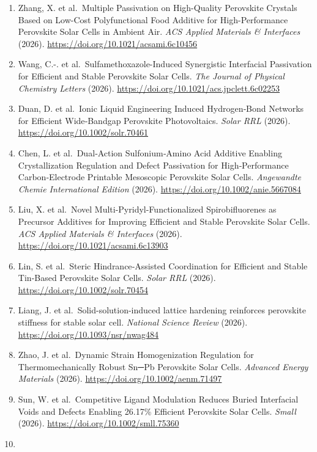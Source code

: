 \documentclass[
  11pt,
]{article}
\begin{document}
\begin{enumerate}
  \emph{Advanced Functional Materials} (2026).
  \url{https://doi.org/10.1002/adfm.78067}
\item
  Zhang, X. et al.~Multiple Passivation on High-Quality Perovskite
  Crystals Based on Low-Cost Polyfunctional Food Additive for
  High-Performance Perovskite Solar Cells in Ambient Air. \emph{ACS
  Applied Materials \& Interfaces} (2026).
  \url{https://doi.org/10.1021/acsami.6c10456}
\item
  Wang, C.-. et al.~Sulfamethoxazole-Induced Synergistic Interfacial
  Passivation for Efficient and Stable Perovskite Solar Cells. \emph{The
  Journal of Physical Chemistry Letters} (2026).
  \url{https://doi.org/10.1021/acs.jpclett.6c02253}
\item
  Duan, D. et al.~Ionic Liquid Engineering Induced Hydrogen‐Bond
  Networks for Efficient Wide‐Bandgap Perovskite Photovoltaics.
  \emph{Solar RRL} (2026). \url{https://doi.org/10.1002/solr.70461}
\item
  Chen, L. et al.~Dual‐Action Sulfonium‐Amino Acid Additive Enabling
  Crystallization Regulation and Defect Passivation for High‐Performance
  Carbon‐Electrode Printable Mesoscopic Perovskite Solar Cells.
  \emph{Angewandte Chemie International Edition} (2026).
  \url{https://doi.org/10.1002/anie.5667084}
\item
  Liu, X. et al.~Novel Multi-Pyridyl-Functionalized Spirobifluorenes as
  Precursor Additives for Improving Efficient and Stable Perovskite
  Solar Cells. \emph{ACS Applied Materials \& Interfaces} (2026).
  \url{https://doi.org/10.1021/acsami.6c13903}
\item
  Lin, S. et al.~Steric Hindrance‐Assisted Coordination for Efficient
  and Stable Tin‐Based Perovskite Solar Cells. \emph{Solar RRL} (2026).
  \url{https://doi.org/10.1002/solr.70454}
\item
  Liang, J. et al.~Solid-solution-induced lattice hardening reinforces
  perovskite stiffness for stable solar cell. \emph{National Science
  Review} (2026). \url{https://doi.org/10.1093/nsr/nwag484}
\item
  Zhao, J. et al.~Dynamic Strain Homogenization Regulation for
  Thermomechanically Robust Sn─Pb Perovskite Solar Cells. \emph{Advanced
  Energy Materials} (2026). \url{https://doi.org/10.1002/aenm.71497}
\item
  Sun, W. et al.~Competitive Ligand Modulation Reduces Buried
  Interfacial Voids and Defects Enabling 26.17\% Efficient Perovskite
  Solar Cells. \emph{Small} (2026).
  \url{https://doi.org/10.1002/smll.75360}
\item

\end{enumerate}
\end{document}
